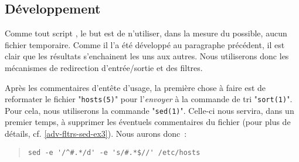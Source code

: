 \subsection{D{\'e}veloppement}

Comme tout script {\Unix}, le but est de n'utiliser, dans la mesure du possible,
aucun fichier temporaire. Comme il l'a {\'e}t{\'e} d{\'e}velopp{\'e} au paragraphe pr{\'e}c{\'e}dent,
il est clair que les r{\'e}sultats s'enchainent les uns aux autres. Nous utiliserons
donc les m{\'e}canismes de redirection d'entr{\'e}e/sortie et des filtres.

Apr{\`e}s les commentaires d'ent{\^e}te d'usage, la premi{\`e}re chose {\`a}
faire est de reformater le fichier "{\tt hosts(5)}" pour
l'{\sl envoyer} {\`a} la commande de tri "{\tt sort(1)}". Pour cela, nous
utiliserons la commande "{\tt sed(1)}". Celle-ci nous servira, dans
un premier temps, {\`a} supprimer les {\'e}ventuels commentaires du fichier
(pour plus de d{\'e}tails, cf. \ref{adv-fltrs-sed-ex3}). Nous aurons donc~:
\begin{quote}
\begin{verbatim}
sed -e '/^#.*/d' -e 's/#.*$//' /etc/hosts
\end{verbatim}
\end{quote}

